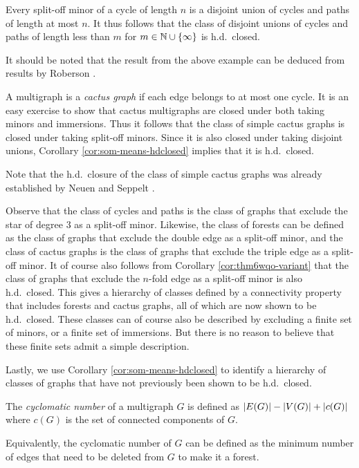 \documentclass[11pt]{article}
\begin{document}
\begin{example}
    Every split-off minor of a cycle of length $n$ is a disjoint union of cycles and paths of length at most $n$. It thus follows that the class of disjoint unions of cycles and paths of length less than $m$ for $m \in \mathbb{N} \cup \{\infty\}$ is h.d.\ closed.
\end{example}
It should be noted that the result from the above example can be deduced from results by Roberson \cite{roberson2022oddomorphisms}.
\par 
\begin{example}
    A multigraph is a \emph{cactus graph} if each edge belongs to at most one cycle.
    It is an easy exercise to show that cactus multigraphs are closed under both taking minors and immersions.
    Thus it follows that the class of simple cactus graphs is closed under taking split-off minors. Since it is also closed under taking disjoint unions, Corollary \ref{cor:som-means-hdclosed} implies that it is h.d.\ closed.
\end{example}
Note that the h.d.\ closure of the class of simple cactus graphs was already established by Neuen and Seppelt \cite{neuen2026distinguishinggraphscountinghomomorphisms}.
\par 
Observe that the class of cycles and paths is the class of graphs that exclude the star of degree 3 as a split-off minor.
Likewise, the class of forests can be defined as the class of graphs that exclude the double edge as a split-off minor, and the class of cactus graphs is the class of graphs that exclude the triple edge as a split-off minor.
It of course also follows from Corollary \ref{cor:thm6wqo-variant} that the class of graphs that exclude the $n$-fold edge as a split-off minor is also h.d.\ closed. 
This gives a hierarchy of classes defined by a connectivity property that includes forests and cactus graphs, all of which are now shown to be h.d.\ closed.
These classes can of course also be described by excluding a finite set of minors, or a finite set of immersions. But there is no reason to believe that these finite sets admit a simple description.
\par 
Lastly, we use Corollary \ref{cor:som-means-hdclosed} to identify a hierarchy of classes of graphs that have not previously been shown to be h.d.\ closed. 
\begin{definition}
    The \emph{cyclomatic number} of a multigraph $G$ is defined as $\abs{E(G)} - \abs{V(G)} + \abs{c(G)}$ where $c(G)$ is the set of connected components of $G$.    
\end{definition}
Equivalently, the cyclomatic number of $G$ can be defined as the minimum number of edges that need to be deleted from $G$ to make it a forest.
\end{document}
